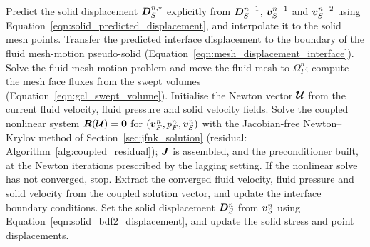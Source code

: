 \begin{algorithm}[htbp]
\caption{Quasi-monolithic FSI solution procedure for one time step, $t^{n-1} \to t^n$}
\label{alg:quasi_monolithic_fsi}
\begin{algorithmic}[1]
\State Predict the solid displacement $\boldsymbol{D}_S^{n,*}$ explicitly from $\boldsymbol{D}_S^{n-1}$, $\boldsymbol{v}_S^{n-1}$ and $\boldsymbol{v}_S^{n-2}$ using Equation~\eqref{eqn:solid_predicted_displacement}, and interpolate it to the solid mesh points.
\State Transfer the predicted interface displacement to the boundary of the fluid mesh-motion pseudo-solid (Equation~\eqref{eqn:mesh_displacement_interface}).
\State Solve the fluid mesh-motion problem and move the fluid mesh to $\Omega_F^n$; compute the mesh face fluxes from the swept volumes (Equation~\eqref{eqn:gcl_swept_volume}).
\State Initialise the Newton vector $\boldsymbol{\mathcal{U}}$ from the current fluid velocity, fluid pressure and solid velocity fields.
\State Solve the coupled nonlinear system
$\boldsymbol{R}(\boldsymbol{\mathcal{U}})=\boldsymbol{0}$ for
$(\boldsymbol{v}_F^n,p_F^n,\boldsymbol{v}_S^n)$ with the Jacobian-free Newton--Krylov method of Section~\ref{sec:jfnk_solution} (residual: Algorithm~\ref{alg:coupled_residual}); $\tilde{\boldsymbol{J}}$ is assembled, and the preconditioner built, at the Newton iterations prescribed by the lagging setting.
\State If the nonlinear solve has not converged, stop.
\State Extract the converged fluid velocity, fluid pressure and solid velocity
from the coupled solution vector, and update the interface boundary conditions.
\State Set the solid displacement $\boldsymbol{D}_S^n$ from $\boldsymbol{v}_S^n$ using Equation~\eqref{eqn:solid_bdf2_displacement}, and update the solid stress and point displacements.
\end{algorithmic}
\end{algorithm}

